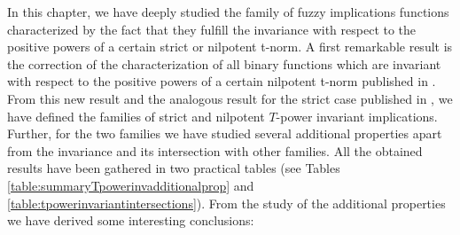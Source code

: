 In this chapter, we have deeply studied the family of fuzzy implications functions characterized by the fact that they fulfill the invariance with respect to the positive powers of a certain strict or nilpotent t-norm.  A first remarkable result is the correction of the characterization of all binary functions which are invariant with respect to the positive powers of a certain nilpotent t-norm published in \cite{Massanet2019B}. From this new result and the analogous result for the strict case published in \cite{Massanet2019B}, we have defined the families of strict and nilpotent $T$-power invariant implications. Further, for the two families we have studied several additional properties apart from the invariance and its intersection with other families. All the obtained results have been gathered in two practical tables (see Tables \ref{table:summaryTpowerinvadditionalprop} and \ref{table:tpowerinvariantintersections}). From the study of the additional properties we have derived some interesting conclusions:
